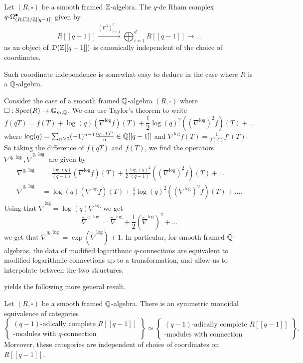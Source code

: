 \begin{theorem}
    Let $(R,\square)$ be a smooth framed $\mathbb{Z}$-algebra. The $q$-de Rham complex $q\text{-}\Omega_{(R,\square)/\mathbb{Z}[[q-1]]}^{\bullet}$ given by 
    $$R[[q-1]]\xrightarrow{(\nabla_{i}^{q})_{i=1}^{d}}\bigoplus_{i=1}^{d}R[[q-1]]\longrightarrow\dots$$
    as an object of $\EuScript{D}(\mathbb{Z}[[q-1]])$ is canonically independent of the choice of coordinates. 
\end{theorem}
Such coordinate independence is somewhat easy to deduce in the case where $R$ is a $\mathbb{Q}$-algebra. 
\begin{example}\label{ex: translation between connections and q-connections}
    Consider the case of a smooth framed $\mathbb{Q}$-algebra $(R,\square)$ where $\square:\operatorname{Spec}(R)\to\mathbb{G}_{m,\mathbb{Q}}$. We can use Taylor's theorem to write 
    $$f(qT)=f(T)+\log(q)(\nabla^{\log}f)(T)+\frac{1}{2}\log(q)^{2}((\nabla^{\log})^{2}f)(T)+\dots$$
    where $\log(q)=\sum_{n\geq0}(-1)^{n-1}\frac{(q-1)^{n}}{n}\in\mathbb{Q}[[q-1]]$ and $\nabla^{\log}f(T)=\frac{1}{f(T)}f'(T)$. So taking the difference of $f(qT)$ and $f(T)$, we find the operators $\nabla^{q,\log},\widetilde{\nabla}^{q,\log}$ are given by 
    \begin{align*}
        \nabla^{q,\log} &= \frac{\log(q)}{(q-1)}(\nabla^{\log}f)(T)+\frac{1}{2}\frac{\log(q)^{2}}{(q-1)}((\nabla^{\log})^{2}f)(T)+\dots\\
        \widetilde{\nabla}^{q,\log} &= \log(q)(\nabla^{\log}f)(T)+\frac{1}{2}\log(q)^{2}((\nabla^{\log})^{2}f)(T)+\dots.
    \end{align*}
    Using that $\widetilde{\nabla}^{\log}=\log(q)\nabla^{\log}$ we get 
    $$\widetilde{\nabla}^{q,\log}=\widetilde{\nabla}^{\log}+\frac{1}{2}(\widetilde{\nabla}^{\log})^{2}+\dots$$
    we get that $\widetilde{\nabla}^{q,\log}=\exp(\widetilde{\nabla}^{\log})+1$. In particular, for smooth framed $\mathbb{Q}$-algebras, the data of modified logarithmic $q$-connections are equivalent to modified logarithmic connections up to a transformation, and allow us to interpolate between the two structures. 
\end{example}
 yields the following more general result. 
\begin{proposition}\label{prop: R-modules with ordinary connection}
    Let $(R,\square)$ be a smooth framed $\mathbb{Q}$-algebra. There is an symmetric monoidal equivalence of categories 
    $$\left\{\substack{(q-1)\text{-adically complete }R[[q-1]] \\ \text{-modules with }q\text{-connection}}\right\}\simeq\left\{\substack{(q-1)\text{-adically complete }R[[q-1]] \\ \text{-modules with connection}}\right\}.$$
    Moreover, these categories are independent of choice of coordinates on $R[[q-1]]$. 
\end{proposition}
